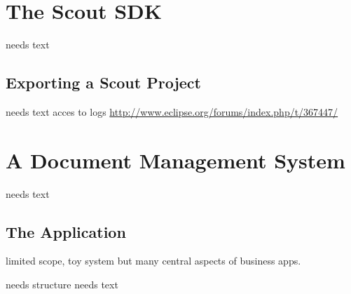 \documentclass[a4paper,10pt,twoside]{book}
\begin{document}
\section{The Scout SDK}
needs text

\subsection{Exporting a Scout Project}
needs text
acces to logs \url{http://www.eclipse.org/forums/index.php/t/367447/}

\section{A Document Management System}
needs text

\subsection{The Application}
limited scope, toy system but many central aspects of business apps. 

needs structure 
needs text

\ifx\wholebook\relax\else
   
   
\end{document}
